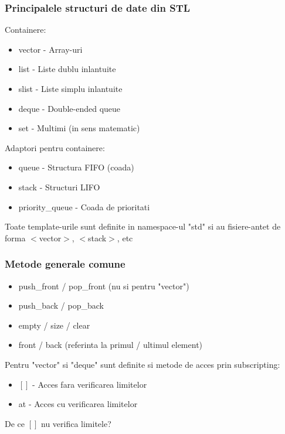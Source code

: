 \documentclass{beamer}
\begin{document}
  \begin{frame}
  \frametitle{Principalele structuri de date din STL}
  Containere:
  \begin{itemize}
  \item vector - Array-uri
  \item list - Liste dublu inlantuite
  \item slist - Liste simplu inlantuite
  \item deque - Double-ended queue
  \item set - Multimi (in sens matematic)
  \end{itemize}
  Adaptori pentru containere:
  \begin{itemize}
  \item queue - Structura FIFO (coada)
  \item stack - Structuri LIFO
  \item priority\_queue - Coada de prioritati
  \end{itemize}
  Toate template-urile sunt definite in namespace-ul "std" si au fisiere-antet de forma $<$vector$>$, $<$stack$>$, etc
  \end{frame}

  \begin{frame}
  \frametitle{Metode generale comune}
  \begin{itemize}
  \pause \item push\_front / pop\_front (nu si pentru "vector")
  \item push\_back / pop\_back
  \pause \item empty / size / clear 
  \item front / back (referinta la primul / ultimul element)
  \end{itemize}
  \pause Pentru "vector" si "deque" sunt definite si metode de acces prin subscripting:
  \begin{itemize}	
  \item $[]$ -  Acces fara verificarea limitelor 
  \item at  -  Acces cu verificarea limitelor
  \end{itemize}
  \pause De ce $[]$ nu verifica limitele?
  \end{frame}
\end{document}
